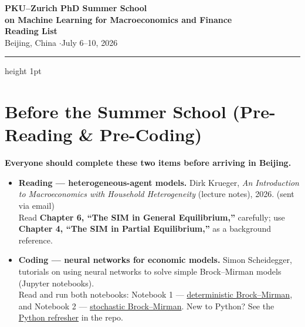 \documentclass[11pt]{article}
\begin{document}
\begin{center}
  {\LARGE\bfseries\color{accent} PKU--Zurich PhD Summer School}\\[3pt]
  {\large\bfseries on Machine Learning for Macroeconomics and Finance}\\[10pt]
  {\Large\bfseries Reading List}\\[8pt]
  {\normalsize Beijing, China \quad$\cdot$\quad July 6--10, 2026}
\end{center}

\vspace{0.4em}
{\color{accent}\hrule height 1pt}
\vspace{1.2em}

\noindent

\section*{Before the Summer School (Pre-Reading \& Pre-Coding)}

{\color{alertred}\textbf{Everyone should complete these two items before arriving in Beijing.}}

\begin{itemize}
  \item \textbf{Reading --- heterogeneous-agent models.}
  Dirk Krueger, \textit{An Introduction to Macroeconomics with Household Heterogeneity} (lecture notes), 2026.
  (sent via email)\\[1.5pt]
  {\small\color{notegray}Read \textbf{Chapter 6, ``The SIM in General Equilibrium,''} carefully; use \textbf{Chapter 4, ``The SIM in Partial Equilibrium,''} as a background reference.}

  \item \textbf{Coding --- neural networks for economic models.}
  Simon Scheidegger, tutorials on using neural networks to solve simple Brock--Mirman models (Jupyter notebooks).\\[1.5pt]
  {\small\color{notegray}Read and run both notebooks:
  Notebook 1 ---
  \href{https://github.com/sischei/Deep_Learning_for_Solving_And_Estimating_Dynamic_Economic_Models/blob/main/lectures/lecture_03_deep_equilibrium_nets/code/lecture_03_01_Brock_Mirman_1972_DEQN.ipynb}{deterministic Brock--Mirman},
  and Notebook 2 ---
  \href{https://github.com/sischei/Deep_Learning_for_Solving_And_Estimating_Dynamic_Economic_Models/blob/main/lectures/lecture_03_deep_equilibrium_nets/code/lecture_03_02_Brock_Mirman_Uncertainty_DEQN.ipynb}{stochastic Brock--Mirman}. New to Python? See the \href{https://github.com/yangycpku/ML_Macro_Finance_Summer2026/tree/main/python_refresher}{Python refresher} in the repo.}
\end{itemize}
\end{document}
